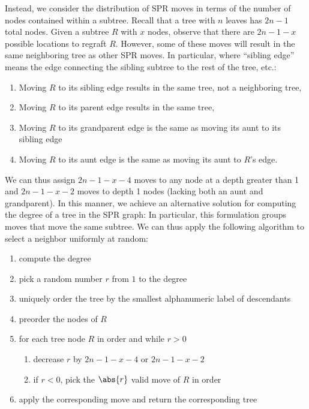 \documentclass{amsart}
\begin{document}
Instead, we consider the distribution of SPR moves in terms of the number of nodes contained within a subtree.
Recall that a tree with $n$ leaves has $2n-1$ total nodes.
Given a subtree $R$ with $x$ nodes, observe that there are $2n-1 - x$ possible locations to regraft $R$.
However, some of these moves will result in the same neighboring tree as other SPR moves.
In particular, where ``sibling edge'' means the edge connecting the sibling subtree to the rest of the tree, etc.:
\begin{enumerate}
\item Moving $R$ to its sibling edge results in the same tree, not a neighboring tree,
\item Moving $R$ to its parent edge results in the same tree,
\item Moving $R$ to its grandparent edge is the same as moving its aunt to its sibling edge
\item Moving $R$ to its aunt edge is the same as moving its aunt to $R$'s edge.
\end{enumerate}
We can thus assign $2n-1-x-4$ moves to any node at a depth greater than 1 and $2n-1-x-2$ moves to depth 1 nodes (lacking both an aunt and grandparent).
In this manner, we achieve an alternative solution for computing the degree of a tree in the SPR graph:
In particular, this formulation groups moves that move the same subtree.
We can thus apply the following algorithm to select a neighbor uniformly at random:

\begin{enumerate}[label={\arabic*}.]
\item	compute the degree
\item pick a random number $r$ from $1$ to the degree
\item uniquely order the tree by the smallest alphanumeric label of descendants
\item preorder the nodes of $R$ 
\item for each tree node $R$ in order and while $r > 0$
	\begin{enumerate}
		\item decrease $r$ by $2n-1-x-4$ or $2n-1-x-2$
		\item if $r < 0$, pick the $\abs{r}$ valid move of $R$ in order
	\end{enumerate}
\item apply the corresponding move and return the corresponding tree
\end{enumerate}
\end{document}
